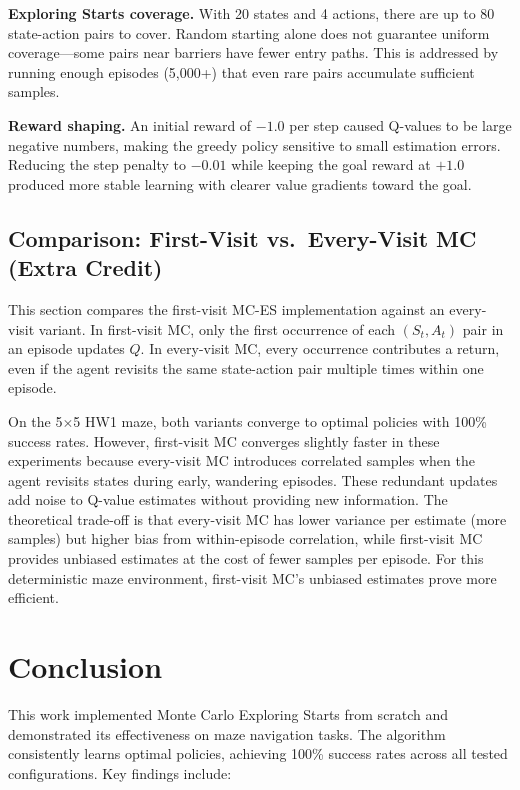 \documentclass[letterpaper]{article}
\begin{document}
\textbf{Exploring Starts coverage.} With 20 states and 4 actions, there are up to 80 state-action pairs to cover. Random starting alone does not guarantee uniform coverage---some pairs near barriers have fewer entry paths. This is addressed by running enough episodes (5,000+) that even rare pairs accumulate sufficient samples.

\textbf{Reward shaping.} An initial reward of $-1.0$ per step caused Q-values to be large negative numbers, making the greedy policy sensitive to small estimation errors. Reducing the step penalty to $-0.01$ while keeping the goal reward at $+1.0$ produced more stable learning with clearer value gradients toward the goal.

\subsection{Comparison: First-Visit vs.\ Every-Visit MC (Extra Credit)}

This section compares the first-visit MC-ES implementation against an every-visit variant. In first-visit MC, only the first occurrence of each $(S_t, A_t)$ pair in an episode updates $Q$. In every-visit MC, every occurrence contributes a return, even if the agent revisits the same state-action pair multiple times within one episode.

On the 5$\times$5 HW1 maze, both variants converge to optimal policies with 100\% success rates. However, first-visit MC converges slightly faster in these experiments because every-visit MC introduces correlated samples when the agent revisits states during early, wandering episodes. These redundant updates add noise to Q-value estimates without providing new information. The theoretical trade-off is that every-visit MC has lower variance per estimate (more samples) but higher bias from within-episode correlation, while first-visit MC provides unbiased estimates at the cost of fewer samples per episode. For this deterministic maze environment, first-visit MC's unbiased estimates prove more efficient.

\section{Conclusion}

This work implemented Monte Carlo Exploring Starts from scratch and demonstrated its effectiveness on maze navigation tasks. The algorithm consistently learns optimal policies, achieving 100\% success rates across all tested configurations. Key findings include:
\end{document}
